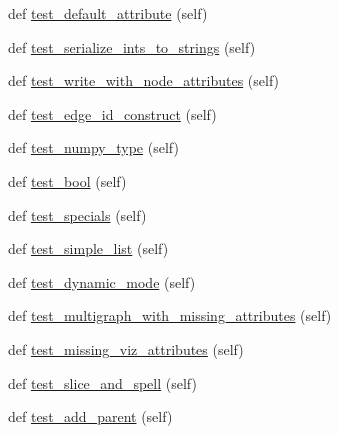 \begin{DoxyCompactItemize}
\item 
def \hyperlink{classnetworkx_1_1readwrite_1_1tests_1_1test__gexf_1_1TestGEXF_ab697544ee1da5b18e2da59a72e51b56a}{test\+\_\+default\+\_\+attribute} (self)
\item 
def \hyperlink{classnetworkx_1_1readwrite_1_1tests_1_1test__gexf_1_1TestGEXF_a46b12360d133855fbacbb4bc6abbf14e}{test\+\_\+serialize\+\_\+ints\+\_\+to\+\_\+strings} (self)
\item 
def \hyperlink{classnetworkx_1_1readwrite_1_1tests_1_1test__gexf_1_1TestGEXF_a39f3a77dcbe6c5b94e126d57627c56dd}{test\+\_\+write\+\_\+with\+\_\+node\+\_\+attributes} (self)
\item 
def \hyperlink{classnetworkx_1_1readwrite_1_1tests_1_1test__gexf_1_1TestGEXF_a84f2f3b55c31d9d9de1880101108eb96}{test\+\_\+edge\+\_\+id\+\_\+construct} (self)
\item 
def \hyperlink{classnetworkx_1_1readwrite_1_1tests_1_1test__gexf_1_1TestGEXF_a667f9caafeb13953e0ad79dc12c29899}{test\+\_\+numpy\+\_\+type} (self)
\item 
def \hyperlink{classnetworkx_1_1readwrite_1_1tests_1_1test__gexf_1_1TestGEXF_a6c5f9b2e174cf9f300db85104a20fdc1}{test\+\_\+bool} (self)
\item 
def \hyperlink{classnetworkx_1_1readwrite_1_1tests_1_1test__gexf_1_1TestGEXF_af42f9163650f7720e9517be67e8069bb}{test\+\_\+specials} (self)
\item 
def \hyperlink{classnetworkx_1_1readwrite_1_1tests_1_1test__gexf_1_1TestGEXF_a9bd306330798304e1929fc87930c6052}{test\+\_\+simple\+\_\+list} (self)
\item 
def \hyperlink{classnetworkx_1_1readwrite_1_1tests_1_1test__gexf_1_1TestGEXF_aa59c6d654ea08d304adb67923510984f}{test\+\_\+dynamic\+\_\+mode} (self)
\item 
def \hyperlink{classnetworkx_1_1readwrite_1_1tests_1_1test__gexf_1_1TestGEXF_ac65ec4d627d16128bff0c662b9a8354b}{test\+\_\+multigraph\+\_\+with\+\_\+missing\+\_\+attributes} (self)
\item 
def \hyperlink{classnetworkx_1_1readwrite_1_1tests_1_1test__gexf_1_1TestGEXF_ad297521b5a2ea789cd8f9a60d5c3ed20}{test\+\_\+missing\+\_\+viz\+\_\+attributes} (self)
\item 
def \hyperlink{classnetworkx_1_1readwrite_1_1tests_1_1test__gexf_1_1TestGEXF_a67aed6be64daf4d9e9ca4148f6226293}{test\+\_\+slice\+\_\+and\+\_\+spell} (self)
\item 
def \hyperlink{classnetworkx_1_1readwrite_1_1tests_1_1test__gexf_1_1TestGEXF_a951ac882d4d0be0c013fa60d8b07fbdb}{test\+\_\+add\+\_\+parent} (self)
\end{DoxyCompactItemize}

